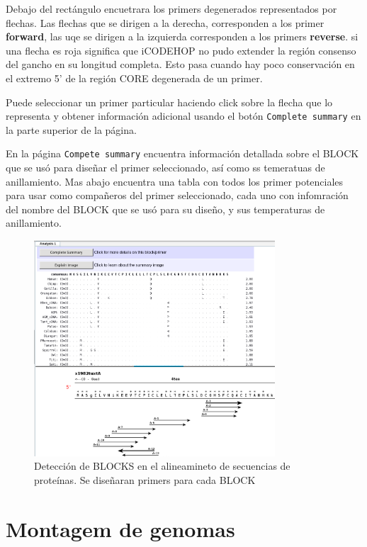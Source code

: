 \documentclass[letter,11pt]{book}
\begin{document}
Debajo del rectángulo encuetrara los primers degenerados representados por flechas. Las flechas que se dirigen a la derecha, corresponden a los primer \textbf{forward}, las uqe se dirigen a la izquierda corresponden a los primers \textbf{reverse}. si una flecha es roja significa que iCODEHOP no pudo extender la región consenso del gancho en su longitud completa. Esto pasa cuando hay poco conservación en el extremo 5' de la región CORE degenerada de un primer.

Puede seleccionar un primer particular haciendo click sobre la flecha que lo representa y obtener información adicional usando el botón \Verb+Complete summary+ en la parte superior de la página.

En la página \Verb+Compete summary+ encuentra información detallada sobre el BLOCK que se usó para diseñar el primer seleccionado, así como ss temeratuas de anillamiento. Mas abajo encuentra una tabla con todos los primer potenciales para usar como compañeros del primer seleccionado, cada uno con infomración del nombre del BLOCK que se usó para su diseño, y sus temperaturas de anillamiento.

\begin{figure}[h!]
\centering
 \includegraphics[width=9cm]{Figs/CODEHOP_resultados.png}
 \caption{\label{fig:CODEHOP_resultados}Detección de BLOCKS en el alineamineto de secuencias de proteínas. Se diseñaran primers para cada BLOCK}
\end{figure}

\chapter{Montagem de genomas}
\end{document}
